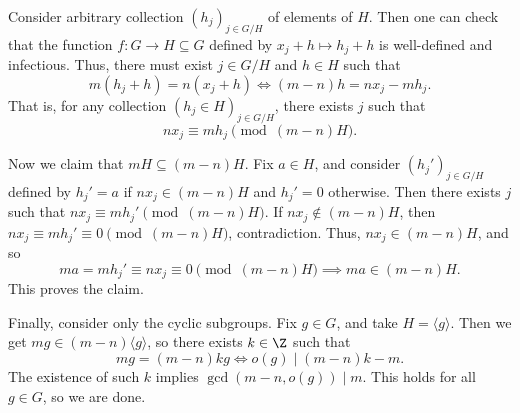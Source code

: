 Consider arbitrary collection $(h_j)_{j \in G/H}$ of elements of $H$.
Then one can check that the function $f : G \to H \subseteq G$ defined by $x_j + h \mapsto h_j + h$ is well-defined and infectious.
Thus, there must exist $j \in G/H$ and $h \in H$ such that
\[ m(h_j + h) = n(x_j + h) \iff (m - n) h = nx_j - mh_j. \]
That is, for any collection $(h_j \in H)_{j \in G/H}$, there exists $j$ such that
\[ nx_j \equiv mh_j \pmod{(m - n) H}. \]

Now we claim that $mH \subseteq (m - n) H$.
Fix $a \in H$, and consider $(h_j')_{j \in G/H}$ defined by $h_j' = a$ if $nx_j \in (m - n) H$ and $h_j' = 0$ otherwise.
Then there exists $j$ such that $nx_j \equiv mh_j' \pmod{(m - n) H}$.
If $nx_j \notin (m - n) H$, then $nx_j \equiv mh_j' \equiv 0 \pmod{(m - n) H}$, contradiction.
Thus, $nx_j \in (m - n) H$, and so
\[ ma = mh_j' \equiv nx_j \equiv 0 \pmod{(m - n) H} \implies ma \in (m - n) H. \]
This proves the claim.

Finally, consider only the cyclic subgroups.
Fix $g \in G$, and take $H = \langle g \rangle$.
Then we get $mg \in (m - n) \langle g \rangle$, so there exists $k \in \Z$ such that
\[ mg = (m - n) kg \iff o(g) \mid (m - n) k - m. \]
The existence of such $k$ implies $\gcd(m - n, o(g)) \mid m$.
This holds for all $g \in G$, so we are done.
